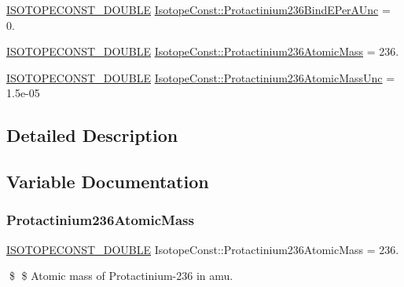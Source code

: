 \begin{DoxyCompactItemize}
\item 
\mbox{\hyperlink{group___isotope_const-_macros_ga8f45a7272ce02c0b4c65c44636ed719a}{I\+S\+O\+T\+O\+P\+E\+C\+O\+N\+S\+T\+\_\+\+D\+O\+U\+B\+LE}} \mbox{\hyperlink{group___isotope_const-_protactinium-_pa236_gab6aa7c9927e7f782ee567566d5a47910}{Isotope\+Const\+::\+Protactinium236\+Bind\+E\+Per\+A\+Unc}} = 0.
\item 
\mbox{\hyperlink{group___isotope_const-_macros_ga8f45a7272ce02c0b4c65c44636ed719a}{I\+S\+O\+T\+O\+P\+E\+C\+O\+N\+S\+T\+\_\+\+D\+O\+U\+B\+LE}} \mbox{\hyperlink{group___isotope_const-_protactinium-_pa236_ga01ffa66266af0931e28b521db94ca447}{Isotope\+Const\+::\+Protactinium236\+Atomic\+Mass}} = 236.
\item 
\mbox{\hyperlink{group___isotope_const-_macros_ga8f45a7272ce02c0b4c65c44636ed719a}{I\+S\+O\+T\+O\+P\+E\+C\+O\+N\+S\+T\+\_\+\+D\+O\+U\+B\+LE}} \mbox{\hyperlink{group___isotope_const-_protactinium-_pa236_ga9f7f83d6977ca973bbec45e90688568b}{Isotope\+Const\+::\+Protactinium236\+Atomic\+Mass\+Unc}} = 1.\+5e-\/05
\end{DoxyCompactItemize}


\subsection{Detailed Description}


\subsection{Variable Documentation}
\mbox{\label{group___isotope_const-_protactinium-_pa236_ga01ffa66266af0931e28b521db94ca447}} 
\subsubsection{\texorpdfstring{Protactinium236\+Atomic\+Mass}{Protactinium236AtomicMass}}
{\footnotesize\ttfamily \mbox{\hyperlink{group___isotope_const-_macros_ga8f45a7272ce02c0b4c65c44636ed719a}{I\+S\+O\+T\+O\+P\+E\+C\+O\+N\+S\+T\+\_\+\+D\+O\+U\+B\+LE}} Isotope\+Const\+::\+Protactinium236\+Atomic\+Mass = 236.}

\$ \$ Atomic mass of Protactinium-\/236 in amu. \mbox{\label{group___isotope_const-_protactinium-_pa236_ga9f7f83d6977ca973bbec45e90688568b}} 
